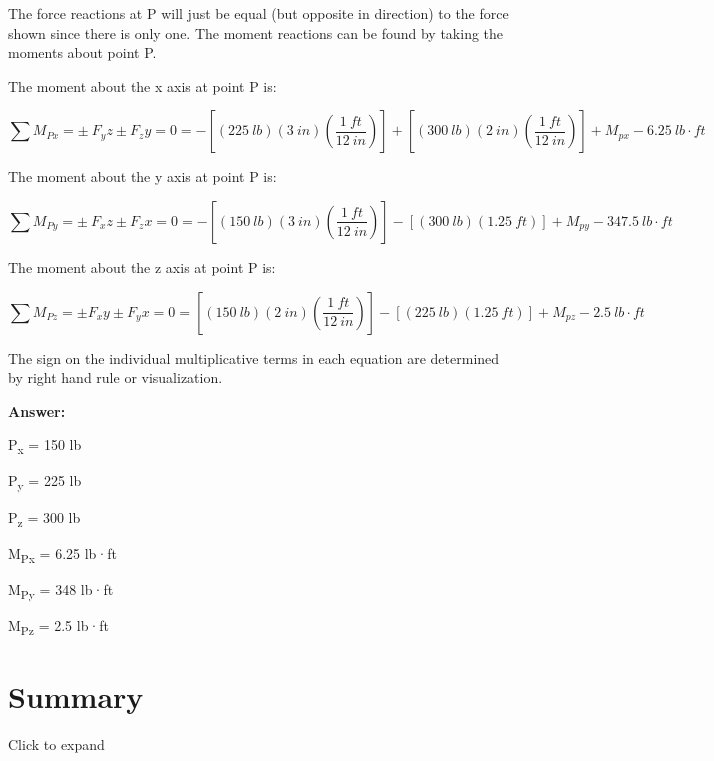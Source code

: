 \documentclass[
  letterpaper,
  DIV=11,
  numbers=noendperiod]{scrreprt}
\begin{document}
\begin{tcolorbox}
\begin{tcolorbox}
The force reactions at P will just be equal (but opposite in direction)
to the force shown since there is only one. The moment reactions can be
found by taking the moments about point P.

The moment about the x axis at point P is:

\[
\sum M_{Px} = \pm ~F_yz \pm F_zy = 0 = -[(225{~lb})(3{~in})(\frac{1{~ft}}{12{~in}})]+[(300{~lb})(2{~in})(\frac{1{~ft}}{12{~in}})]+M_{px} -6.25{~lb·ft}
\]

The moment about the y axis at point P is:

\[
\sum M_{Py} = \pm ~F_xz \pm F_zx = 0 = -[(150{~lb})(3{~in})(\frac{1{~ft}}{12{~in}})]-[(300{~lb})(1.25{~ft})]+M_{py} -347.5{~lb·ft}
\]

The moment about the z axis at point P is:

\[
\sum M_{Pz} = \pm F_xy \pm F_yx = 0 = [(150{~lb})(2{~in})(\frac{1{~ft}}{12{~in}})]-[(225{~lb})(1.25{~ft})]+M_{pz} -2.5{~lb·ft}
\]

The sign on the individual multiplicative terms in each equation are
determined by right hand rule or visualization.

\textbf{Answer:}

P\textsubscript{x} = 150 lb

P\textsubscript{y} = 225 lb

P\textsubscript{z} = 300 lb

M\textsubscript{Px} = 6.25 lb·ft

M\textsubscript{Py} = 348 lb·ft

M\textsubscript{Pz} = 2.5 lb·ft

\end{tcolorbox}

\end{tcolorbox}

\section*{Summary}\label{summary}


Click to expand
\end{document}
